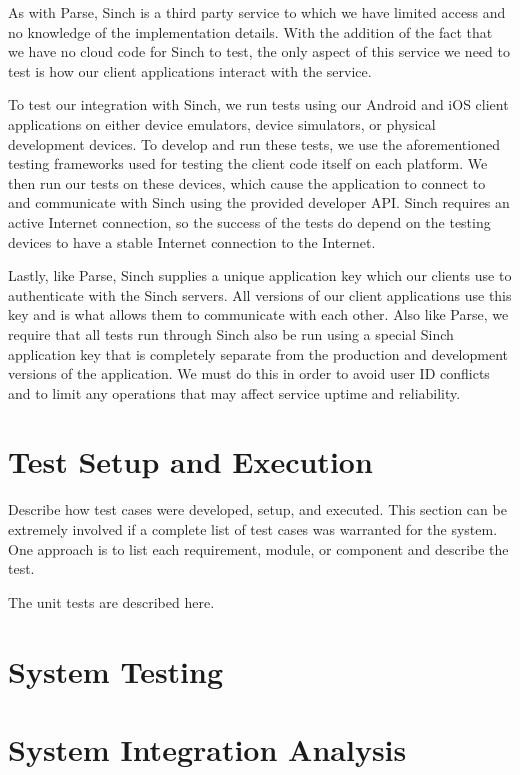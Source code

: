 As with Parse, Sinch is a third party service to which we have limited access
and no knowledge of the implementation details. With the addition of the fact
that we have no cloud code for Sinch to test, the only aspect of this service we
need to test is how our client applications interact with the service.

To test our integration with Sinch, we run tests using our Android and iOS
client applications on either device emulators, device simulators, or physical
development devices. To develop and run these tests, we use the aforementioned
testing frameworks used for testing the client code itself on each platform.
We then run our tests on these devices, which cause the application to connect
to and communicate with Sinch using the provided developer API. Sinch requires
an active Internet connection, so the success of the tests do depend on the
testing devices to have a stable Internet connection to the Internet.

Lastly, like Parse, Sinch supplies a unique application key which our clients
use to authenticate with the Sinch servers. All versions of our client
applications use this key and is what allows them to communicate with each
other. Also like Parse, we require that all tests run through Sinch also be run
using a special Sinch application key that is completely separate from the
production and development versions of the application. We must do this in order
to avoid user ID conflicts and to limit any operations that may affect service
uptime and reliability.


\section{Test Setup and Execution}
Describe how test cases were developed, setup, and executed.  This section can 
be extremely involved if a complete list of test cases was warranted for the system.   One 
approach is to list each requirement, module, or component and describe the test.

The unit tests are described here.

\section{System Testing}

\section{System Integration Analysis}

